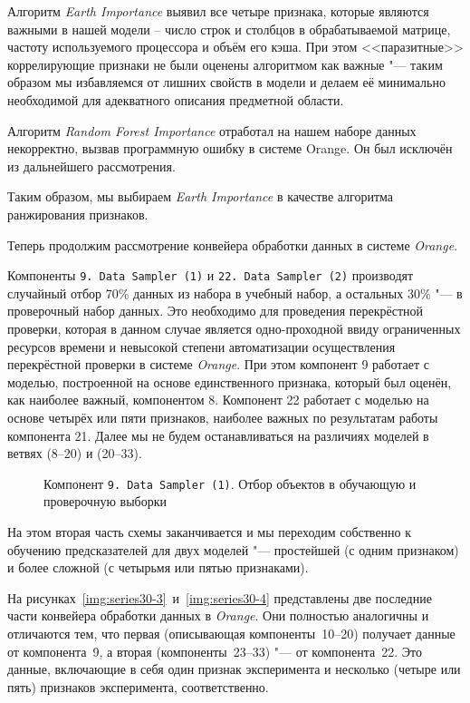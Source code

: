 Алгоритм \textit{Earth Importance} выявил все четыре признака, которые являются важными в нашей модели -- число строк и столбцов в обрабатываемой матрице, частоту используемого процессора и объём его кэша. При этом <<паразитные>> коррелирующие признаки не были оценены алгоритмом как важные "--- таким образом мы избавляемся от лишних свойств в модели и делаем её минимально необходимой для адекватного описания предметной области.

Алгоритм \textit{Random Forest Importance} отработал на нашем наборе данных некорректно, вызвав программную ошибку в системе Orange. Он был исключён из дальнейшего рассмотрения.

Таким образом, мы выбираем \textit{Earth Importance} в качестве алгоритма ранжирования признаков.

Теперь продолжим рассмотрение конвейера обработки данных в системе \textit{Orange}.

Компоненты \texttt{9.\,Data~Sampler~(1)} и \texttt{22.\,Data~Sampler~(2)} производят случайный отбор 70\% данных из набора в учебный набор, а остальных 30\% "--- в проверочный набор данных. Это необходимо для проведения перекрёстной проверки, которая в данном случае является одно-проходной ввиду ограниченных ресурсов времени и невысокой степени автоматизации осуществления перекрёстной проверки в системе \textit{Orange}. При этом компонент 9 работает с моделью, построенной на основе единственного признака, который был оценён, как наиболее важный, компонентом 8. Компонент 22 работает с моделью на основе четырёх или пяти признаков, наиболее важных по результатам работы компонента 21. Далее мы не будем останавливаться на различиях моделей в ветвях (8--20) и (20--33).

\begin{figure}[tbp]
    \caption{Компонент \texttt{9.\,Data~Sampler~(1)}. Отбор объектов в обучающую и проверочную выборки}
    \label{img:9-Data-Sampler-1}
\end{figure}

На этом вторая часть схемы заканчивается и мы переходим собственно к обучению предсказателей для двух моделей "--- простейшей (с одним признаком) и более сложной (с четырьмя или пятью признаками).

На рисунках~\ref{img:series30-3}~и~\ref{img:series30-4} представлены две последние части конвейера обработки данных в \textit{Orange}. Они полностью аналогичны и отличаются тем, что первая (описывающая компоненты~10--20) получает данные от компонента~9, а вторая (компоненты~23--33) "--- от компонента~22. Это данные, включающие в себя один признак эксперимента и несколько (четыре или пять) признаков эксперимента, соответственно.


